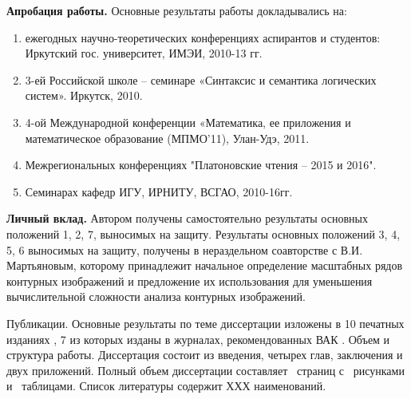 \noindent
\textbf{Апробация работы.} Основные результаты работы докладывались на: 
\begin{enumerate}
\item ежегодных научно-теоретических конференциях аспирантов и студентов:  Иркутский  гос. университет, ИМЭИ, 2010-13 гг.
\item 3-ей Российской школе – семинаре «Синтаксис и семантика логических систем». Иркутск, 2010.
\item 4-ой Международной конференции «Математика, ее приложения и математическое   
    образование (МПМО’11),  Улан-Удэ, 2011.
\item Межрегиональных конференциях "Платоновские чтения – 2015 и 2016".
\item Семинарах кафедр ИГУ, ИРНИТУ, ВСГАО, 2010-16гг.
\end{enumerate}

\textbf{Личный вклад.} Автором получены самостоятельно результаты основных положений 1, 2, 7,  выносимых  на защиту.  Результаты основных положений 3, 4, 5, 6  выносимых  на защиту, получены в нераздельном соавторстве с В.И. Мартьяновым, которому принадлежит начальное определение масштабных рядов контурных изображений и предложение их использования для уменьшения вычислительной сложности анализа контурных изображений.

Публикации. Основные результаты по теме диссертации изложены в 10 печатных
изданиях \cite{D5,D6,D7,D8, D15,D16,D18,D19,D20,scaleline}, 7 из которых изданы в журналах, рекомендованных ВАК \cite{D6,D7,D8, D15,D19,D20,scaleline}.
Объем и структура работы. Диссертация состоит из введения, четырех глав, заключения и двух приложений. Полный объем диссертации составляет \pageref{LastPage}\ страниц с \totalfigures\ рисунками и \totaltables\ таблицами. Список литературы содержит ХХХ наименований.

%



